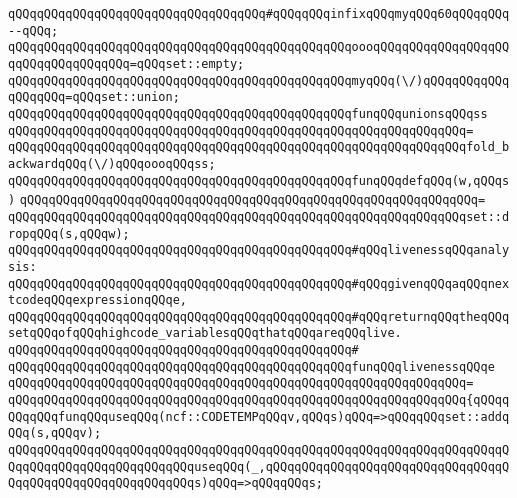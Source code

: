 \verb|qQQqqQQqqQQqqQQqqQQqqQQqqQQqqQQqqQQq#qQQqqQQqinfixqQQqmyqQQq60qQQqqQQq--qQQq;|\newline
\newline
\verb|qQQqqQQqqQQqqQQqqQQqqQQqqQQqqQQqqQQqqQQqqQQqqQQqoooqQQqqQQqqQQqqQQqqQQqqQQqqQQqqQQqqQQq=qQQqset::empty;|\newline
\verb|qQQqqQQqqQQqqQQqqQQqqQQqqQQqqQQqqQQqqQQqqQQqqQQqmyqQQq(\/)qQQqqQQqqQQqqQQqqQQq=qQQqset::union;|\newline
\newline
\verb|qQQqqQQqqQQqqQQqqQQqqQQqqQQqqQQqqQQqqQQqqQQqqQQqfunqQQqunionsqQQqss|\newline
\verb|qQQqqQQqqQQqqQQqqQQqqQQqqQQqqQQqqQQqqQQqqQQqqQQqqQQqqQQqqQQqqQQq=|\newline
\verb|qQQqqQQqqQQqqQQqqQQqqQQqqQQqqQQqqQQqqQQqqQQqqQQqqQQqqQQqqQQqqQQqfold_backwardqQQq(\/)qQQqoooqQQqss;|\newline
\newline
\verb|qQQqqQQqqQQqqQQqqQQqqQQqqQQqqQQqqQQqqQQqqQQqqQQqfunqQQqdefqQQq(w,qQQqs)|\newline
\verb|qQQqqQQqqQQqqQQqqQQqqQQqqQQqqQQqqQQqqQQqqQQqqQQqqQQqqQQqqQQqqQQq=|\newline
\verb|qQQqqQQqqQQqqQQqqQQqqQQqqQQqqQQqqQQqqQQqqQQqqQQqqQQqqQQqqQQqqQQqset::dropqQQq(s,qQQqw);|\newline
\newline
\newline
\verb|qQQqqQQqqQQqqQQqqQQqqQQqqQQqqQQqqQQqqQQqqQQqqQQq#qQQqlivenessqQQqanalysis:|\newline
\verb|qQQqqQQqqQQqqQQqqQQqqQQqqQQqqQQqqQQqqQQqqQQqqQQq#qQQqgivenqQQqaqQQqnextcodeqQQqexpressionqQQqe,|\newline
\verb|qQQqqQQqqQQqqQQqqQQqqQQqqQQqqQQqqQQqqQQqqQQqqQQq#qQQqreturnqQQqtheqQQqsetqQQqofqQQqhighcode_variablesqQQqthatqQQqareqQQqlive.|\newline
\verb|qQQqqQQqqQQqqQQqqQQqqQQqqQQqqQQqqQQqqQQqqQQqqQQq#|\newline
\verb|qQQqqQQqqQQqqQQqqQQqqQQqqQQqqQQqqQQqqQQqqQQqqQQqfunqQQqlivenessqQQqe|\newline
\verb|qQQqqQQqqQQqqQQqqQQqqQQqqQQqqQQqqQQqqQQqqQQqqQQqqQQqqQQqqQQqqQQq=|\newline
\verb|qQQqqQQqqQQqqQQqqQQqqQQqqQQqqQQqqQQqqQQqqQQqqQQqqQQqqQQqqQQqqQQq{qQQqqQQqqQQqfunqQQquseqQQq(ncf::CODETEMPqQQqv,qQQqs)qQQq=>qQQqqQQqset::addqQQq(s,qQQqv);|\newline
\verb|qQQqqQQqqQQqqQQqqQQqqQQqqQQqqQQqqQQqqQQqqQQqqQQqqQQqqQQqqQQqqQQqqQQqqQQqqQQqqQQqqQQqqQQqqQQqqQQquseqQQq(_,qQQqqQQqqQQqqQQqqQQqqQQqqQQqqQQqqQQqqQQqqQQqqQQqqQQqqQQqqQQqs)qQQq=>qQQqqQQqs;|\newline
